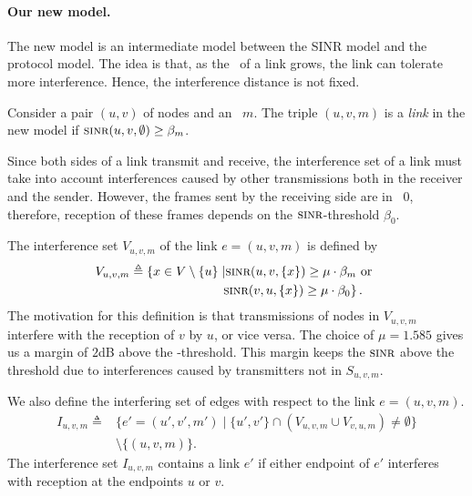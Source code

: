 \documentclass[12pt]{article}
\newtheorem{claim}[theorem]{Claim}
\newenvironment{proof sketch}[1]{\noindent {\emph{Proof sketch of #1:}}}{\hfill \qed}
\newcommand{\eqdf}{\triangleq}
\newcommand{\SINR}{\text{\sc{sinr}}}
\newcommand{\SNR}{\text{\sc{snr}}}
\newcommand{\MCS}{\text{\sc{mcs}}}
\begin{document}
\paragraph{Our new model.}
The new model is an intermediate model between the SINR model and the
protocol model. The idea is that, as the \SNR\ of a link grows, the
link can tolerate more interference. Hence, the interference distance
is not fixed.

Consider a pair $(u,v)$ of nodes and an \MCS\ $m$.
The triple $(u,v,m)$ is a \emph{link} in the new model if
$\SINR(u,v,\emptyset) \geq \beta_m$.

Since both sides of a link transmit and receive, the interference set
of a link must take into account interferences caused by other
transmissions both in the receiver and the sender. However, the frames
sent by the receiving side are in \MCS\ $0$, therefore, reception of
these frames depends on the $\SINR$-threshold $\beta_0$.

The interference set $V_{u,v,m}$ of the link $e=(u,v,m)$ is defined by
  \begin{align*}
    V_{u,v,m} \eqdf \left\{ x \in V \setminus\{u\}\right. &\left | \SINR(u,v,\{x\}) \geq \mu  \cdot \beta_m \text{ or } \right. \\
    & \left.\SINR(v,u,\{x\}) \geq \mu \cdot \beta_0\right\}.
\end{align*}
The motivation for this definition is that transmissions of nodes in $V_{u,v,m}$ interfere with
the reception of $v$ by $u$, or vice versa.
The choice of $\mu=1.585$ gives us a margin of $2$dB above the
\SINR-threshold.  This margin keeps the $\SINR$ above the threshold
due to interferences caused by transmitters not in $S_{u,v,m}$.

We also define the interfering set of edges with respect to the link $e=(u,v,m)$.
\begin{align*}
  I_{u,v,m} \eqdf &\{ e'=(u',v',m') \mid \{u',v'\} \cap (V_{u,v,m} \cup V_{v,u,m})
 \neq \emptyset\}\\& \setminus \{(u,v,m)\}.
\end{align*}
The interference set $I_{u,v,m}$ contains a link $e'$ if either
endpoint of $e'$ interferes with reception at the endpoints $u$ or
$v$.

\end{document}

